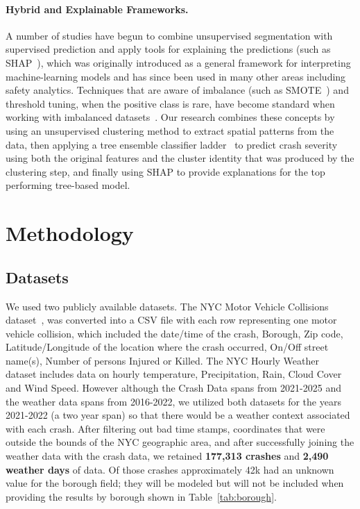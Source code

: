 \documentclass{article}
\begin{document}
\paragraph{Hybrid and Explainable Frameworks.}
A number of studies have begun to combine unsupervised segmentation with
supervised prediction and apply tools for explaining the predictions (such
as SHAP~\cite{lundberg2017shap}), which was originally introduced as a
general framework for interpreting machine-learning models and has since
been used in many other areas including safety analytics. Techniques that
are aware of imbalance (such as SMOTE~\cite{chawla2002smote}) and threshold
tuning, when the positive class is rare, have become standard when working
with imbalanced datasets~\cite{he2009imbalanced}. Our research combines
these concepts by using an unsupervised clustering method to extract spatial
patterns from the data, then applying a tree ensemble classifier
ladder~\cite{breiman2001random, chen2016xgboost} to predict crash severity
using both the original features and the cluster identity that was produced
by the clustering step, and finally using SHAP to provide explanations for
the top performing tree-based model.

\section{Methodology}
\label{sec:method}

\subsection{Datasets}
We used two publicly available datasets. The NYC Motor Vehicle Collisions
dataset~\cite{nyc_collisions}, was converted into a CSV file with each row
representing one motor vehicle collision, which included the date/time of
the crash, Borough, Zip code, Latitude/Longitude of the location where the
crash occurred, On/Off street name(s), Number of persons Injured or Killed.
The NYC Hourly Weather~\cite{nyc_weather} dataset includes data on hourly
temperature, Precipitation, Rain, Cloud Cover and Wind Speed. However
although the Crash Data spans from 2021-2025 and the weather data spans
from 2016-2022, we utilized both datasets for the years 2021-2022 (a two
year span) so that there would be a weather context associated with each
crash. After filtering out bad time stamps, coordinates that were outside
the bounds of the NYC geographic area, and after successfully joining the
weather data with the crash data, we retained \textbf{177,313 crashes} and
\textbf{2,490 weather days} of data. Of those crashes approximately 42k
had an unknown value for the borough field; they will be modeled but will
not be included when providing the results by borough shown in
Table~\ref{tab:borough}.
\end{document}
